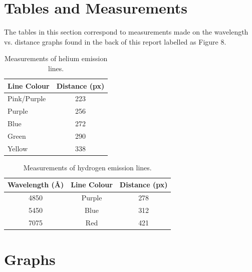\documentclass{article}
\begin{document}

\section{Tables and Measurements}
\label{sec:tnm}

The tables in this section correspond to measurements made on the wavelength vs. distance
graphs found in the back of this report labelled as Figure 8.

\begin{table}[h!]
\begin{center}
\begin{tabular}{l c}
\hline
Line Colour & Distance (px)\\
\hline
\hline
Pink/Purple & 223\\
Purple & 256\\
Blue & 272\\
Green & 290\\
Yellow & 338\\
\hline
\end{tabular}
\end{center}
\caption{Measurements of helium emission lines.\label{tab:helium}}
\end{table}

\begin{table}[h!]
\begin{center}
\begin{tabular}{c c c}
\hline
Wavelength (\AA) & Line Colour & Distance (px)\\
\hline
\hline
4850 & Purple & 278\\
5450 & Blue & 312\\
7075 & Red & 421\\
\hline
\end{tabular}
\end{center}
\caption{Measurements of hydrogen emission lines.\label{tab:helium}}
\end{table}


\section{Graphs}
\end{document}
